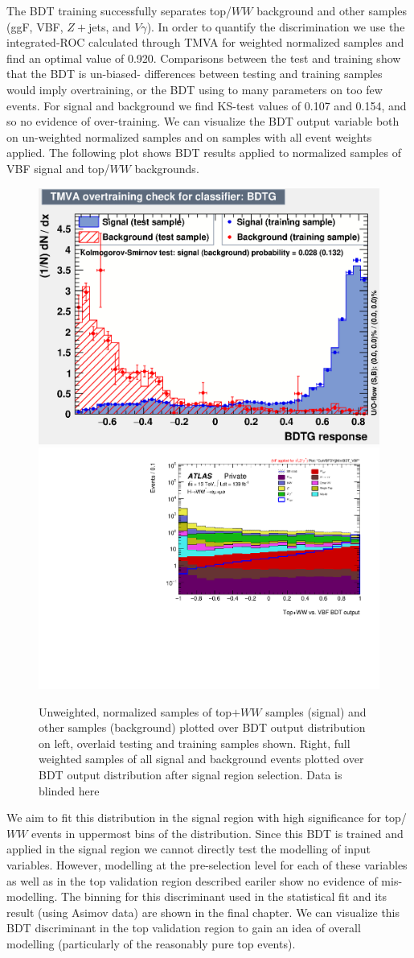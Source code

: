 The BDT training successfully separates top/$WW$ background and other samples (ggF, VBF, $Z+$jets, and $V\gamma$). In order to quantify the discrimination we use the integrated-ROC calculated through TMVA for weighted normalized samples and find an optimal value of 0.920. Comparisons between the test and training show that the BDT is un-biased- differences between testing and training samples would imply overtraining, or the BDT using to many parameters on too few events. For signal and background we find KS-test values of 0.107 and 0.154, and so no evidence of over-training. We can visualize the BDT output variable both on un-weighted normalized samples and on samples with all event weights applied. The following plot shows BDT results applied to normalized samples of VBF signal and top/$WW$ backgrounds.

\begin{figure}[!htbp]
\centering
  \includegraphics[width=.45\linewidth]{Pictures/Top+WWvsEverything/overtrain_BDTG.eps}
  \includegraphics[width=.35\linewidth]{Pictures/run2-emme-CutVBFDYjjMin-BDT_VBF-log.pdf}
\caption{Unweighted, normalized samples of top$+WW$ samples (signal) and other samples (background) plotted over BDT output distribution on left, overlaid testing and training samples shown. Right, full weighted samples of all signal and background events plotted over BDT output distribution after signal region selection. Data is blinded here}
\label{fig:TopBDTresult}
\end{figure}

We aim to fit this distribution in the signal region with high significance for top/$WW$ events in uppermost bins of the distribution. Since this BDT is trained and applied in the signal region we cannot directly test the modelling of input variables. However, modelling at the pre-selection level for each of these variables as well as in the top validation region described eariler show no evidence of mis-modelling. The binning for this discriminant used in the statistical fit and its result (using Asimov data) are shown in the final chapter. We can visualize this BDT discriminant in the top validation region to gain an idea of overall modelling (particularly of the reasonably pure top events).

